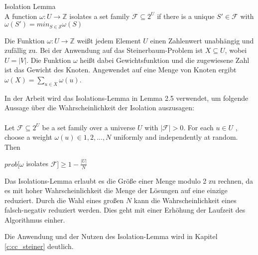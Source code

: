 \begin{definition}
Isolation Lemma\\
 A function $\omega : U \rightarrow \mathbb{Z}$ isolates a set family $\mathcal{F} \subseteq 2^U$ if there is a unique $S' \in \mathcal{F}$ with $\omega (S')=min_{S \in \mathcal{S}} \omega(S)$\\
\end{definition}

Die Funktion $\omega : U \rightarrow \mathbb{Z}$ weißt jedem Element $U$ einen Zahlenwert unabhängig und zufällig zu.
Bei der Anwendung auf das Steinerbaum-Problem ist $X \subseteq U$, wobei $U=|V|$.
Die Funktion $\omega$ heißt dabei Gewichtsfunktion und die zugewiesene Zahl ist das Gewicht des Knoten. Angewendet auf eine Menge von Knoten ergibt $\omega(X)=\sum_{u \in X}\omega(u)$.

In der Arbeit \cite{cygan_solving_2011} wird das Isolations-Lemma in Lemma 2.5 verwendet, um folgende Aussage über die Wahrscheinlichkeit der Isolation auszusagen:\\
\\Let $\mathcal{F} \subseteq 2^U$ be a set family over a universe $U$ with $|\mathcal{F}| > 0$. For each $u \in U$ ,
choose a weight $\omega(u) \in {1, 2, . . . , N }$ uniformly and independently at random. Then
\begin{center}
$prob[\omega$ isolates $\mathcal{F}]\geq 1 - \frac{|U|}{N}$
\end{center}

Das Isolations-Lemma erlaubt es die Größe einer Menge modulo 2 zu rechnen, da es mit hoher Wahrscheinlichkeit die Menge der Lösungen auf eine einzige reduziert. Durch die Wahl eines großen $N$ kann die Wahrscheinlichkeit eines falsch-negativ reduziert werden. Dies geht mit einer Erhöhung der Laufzeit des Algorithmus einher.

Die Anwendung und der Nutzen des Isolation-Lemma wird in Kapitel \ref{c:cc_steiner} deutlich.
